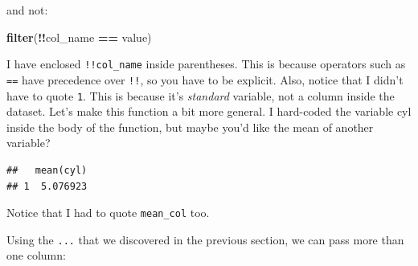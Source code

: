 \documentclass[]{gitbook}
\newenvironment{Shaded}{\begin{snugshade}}{\end{snugshade}}
\newcommand{\ControlFlowTok}[1]{\textcolor[rgb]{0.13,0.29,0.53}{\textbf{#1}}}
\newcommand{\DecValTok}[1]{\textcolor[rgb]{0.00,0.00,0.81}{#1}}
\newcommand{\KeywordTok}[1]{\textcolor[rgb]{0.13,0.29,0.53}{\textbf{#1}}}
\newcommand{\NormalTok}[1]{#1}
\newcommand{\OperatorTok}[1]{\textcolor[rgb]{0.81,0.36,0.00}{\textbf{#1}}}
\newcommand{\StringTok}[1]{\textcolor[rgb]{0.31,0.60,0.02}{#1}}
\theoremstyle{definition}
\theoremstyle{definition}
\theoremstyle{definition}
\theoremstyle{remark}
\begin{document}
and not:

\begin{Shaded}
\begin{Highlighting}[]
\KeywordTok{filter}\NormalTok{(}\OperatorTok{!!}\NormalTok{col_name }\OperatorTok{==}\StringTok{ }\NormalTok{value)}
\end{Highlighting}
\end{Shaded}

I have enclosed \texttt{!!col\_name} inside parentheses. This is because
operators such as \texttt{==} have precedence over \texttt{!!}, so you
have to be explicit. Also, notice that I didn't have to quote
\texttt{1}. This is because it's \emph{standard} variable, not a column
inside the dataset. Let's make this function a bit more general. I
hard-coded the variable cyl inside the body of the function, but maybe
you'd like the mean of another variable?

\begin{Shaded}
\end{Shaded}

\begin{verbatim}
##   mean(cyl)
## 1  5.076923
\end{verbatim}

Notice that I had to quote \texttt{mean\_col} too.

Using the \texttt{...} that we discovered in the previous section, we
can pass more than one column:

\begin{Shaded}
\end{Shaded}
\end{document}
